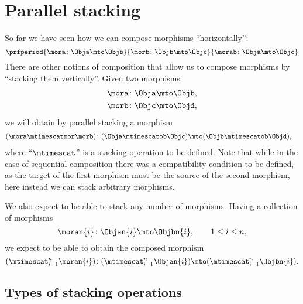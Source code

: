 
\section{Parallel stacking}
\label{sec:parallel-stacking}

So far we have seen how we can compose morphisms ``horizontally'':
%
\begin{equation}
    \prfperiod{
        \mora \colon \Obja \mto \Objb
    }{
        \morb\colon \Objb \mto \Objc
    }{
        \morab \colon \Obja \mto \Objc
    }
\end{equation}
%
There are other notions of composition that allow us to compose morphisms by ``stacking them vertically''.
Given two morphisms
%
\begin{align}
    \mora & \colon \Obja \mto \Objb, \\
    \morb & \colon \Objc \mto \Objd,
\end{align}
%
we will obtain by parallel stacking a morphism
%
\begin{align}
    (\mora\mtimescatmor \morb)
     & \colon (\Obja \mtimescatob \Objc) \mto (\Objb \mtimescatob \Objd),
\end{align}
%
where ``$\mtimescat$'' is a stacking operation to be defined.
Note that while in the case of sequential composition there was a compatibility condition to be defined, as the target of the first morphism must be the source of the second morphism, here instead we can stack arbitrary morphisms.

We also expect to be able to stack any number of morphisms.
Having a collection of morphisms
%
\begin{equation}
    \moran{i} \colon \Objan{i} \mto \Objbn{i}, \qquad 1 \leq i \leq n,
\end{equation}
%
we expect to be able to obtain the composed morphism
%
\begin{equation}
    (\mtimescat_{i=1}^n  \moran{i} )
    \colon( \mtimescat_{i=1}^n  \Objan{i} )\mto (\mtimescat_{i=1}^n  \Objbn{i}).
\end{equation}

\subsection{Types of stacking operations}


